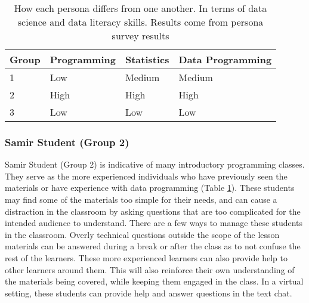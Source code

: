 \documentclass[020-persona\_validation.tex]{subfiles}
\begin{document}
        \begin{table}[htb]
            \centering
            \caption[Persona Data Science Skill Rating]
            {How each persona differs from one another. In terms of data science and data literacy skills.
             Results come from persona survey results
            }
            \begin{tabular}{llll}
            \hline
            Group & Programming & Statistics & Data Programming \\%
            \hline
            1     & Low         & Medium     & Medium           \\%
            2     & High        & High       & High             \\%
            3     & Low         & Low        & Low              \\%
            \hline
            \end{tabular}
            \label{tab:persona-summary-table}
        \end{table}

        \subsubsection{Samir Student (Group 2)}

            Samir Student (Group 2) is indicative of many introductory programming classes.
            They serve as the more experienced individuals who have previously seen the materials
            or have experience with data programming (Table \ref{tab:persona-summary-table}).
            These students may find some of the materials too simple for their needs,
            and can cause a distraction in the classroom by asking questions that are too complicated
            for the intended audience to understand.
            There are a few ways to manage these students in the classroom.
            Overly technical questions outside the scope of the lesson materials
            can be answered during a break or after the class as to not confuse the rest of the learners.
            These more experienced learners can also provide help to other learners around them.
            This will also reinforce their own understanding of the materials being covered,
            while keeping them engaged in the class.
            In a virtual setting,
            these students can provide help and answer questions in the text chat.
\end{document}
